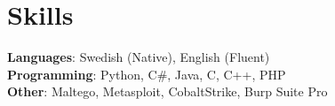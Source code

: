 \documentclass[A4,11pt]{article}
\begin{document}
\section{Skills}
 \begin{itemize}[leftmargin=0.5cm, label={}]
    \small{\item{
     \textbf{Languages}{: Swedish (Native), English (Fluent)} \\
     \textbf{Programming}{: Python, C\#, Java, C, C++, PHP} \\
     \textbf{Other}{: Maltego, Metasploit, CobaltStrike, Burp Suite Pro} \\
    }}
 \end{itemize}
    
\end{document}
